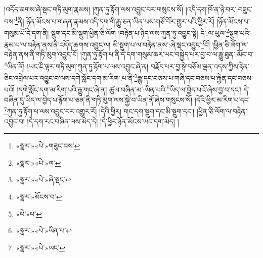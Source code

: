 །འདོད་ཆགས་ཞེ་སྡང་གཏི་མུག་རྣམས། །ཀུན་ཏུ་རྟོག་ལས་འབྱུང་བར་གསུངས་སོ། །འདི་དག་ཁོ་ན་ཉེ་བར་:བཟུང་བས་\footnote{«སྣར་»«པེ་»གཟུང་བས་}ནི། ཉོན་མོངས་པ་གཞན་རྣམས་འདི་དག་གི་རྒྱུ་ཅན་ཡིན་པས་གཙོ་བོར་གྱུར་པའི་ཕྱིར་རོ། །ཉོན་མོངས་པ་གསུམ་པོ་དེ་དག་ནི། སྡུག་དང་མི་སྡུག་ཕྱིན་ཅི་ལོག །བརྟེན་པ་ཉིད་ལས་ཀུན་ཏུ་འབྱུང་སྟེ། དེ་:ལ་ཡུལ་\footnote{«སྣར་»«པེ་»ལ་}སྡུག་པའི་རྣམ་པ་ལ་བརྟེན་ནས་ནི་འདོད་ཆགས་འབྱུང་ལ། མི་སྡུག་པ་ལ་བརྟེན་ནས་:ཞེ་སྡང་འབྱུང་\footnote{«སྣར་»«པེ་»ཞེ་སྡང་}ངོ། །ཕྱིན་ཅི་ལོག་ལ་བརྟེན་ནས་ནི་གཏི་མུག་འབྱུང་ངོ། །ཀུན་ཏུ་རྟོག་པ་ནི་དེ་དག་གསུམ་ཆར་ཡང་བསྐྱེད་པར་བྱ་བ་ལ་རྒྱུ་ཐུན་:མོང་བ་\footnote{«སྣར་»མོངས་བ་}ཡིན་ནོ། །ཡང་ཇི་ལྟར་གཏི་མུག་ཀུན་ཏུ་རྟོག་པ་ལས་འབྱུང་ཞེ་ན། བརྗོད་པར་བྱ་སྟེ་བཅོམ་ལྡན་འདས་ཀྱིས་རྟེན་ཅིང་འབྲེལ་པར་འབྱུང་བ་ལས་དགེ་སློང་དག་མ་རིག་:པ་ནི་\footnote{«པེ་»པ་}རྒྱུ་དང་བཅས་པ་གཞི་དང་བཅས་པ་རྐྱེན་དང་བཅས་པའོ། །དགེ་སློང་དག་མ་རིག་པའི་རྒྱུ་གང་ཞེ་ན། ཚུལ་བཞིན་མ་:ཡིན་པའི་\footnote{«སྣར་»«པེ་»ཡིན་པ་}ཡིད་ལ་བྱེད་པའོ་ཞེས་བྱ་བ་དང་། དེ་བཞིན་དུ་ཡིད་ལ་བྱེད་པ་རྙོག་པ་ཅན་ནི་གཏི་མུག་ལས་སྐྱེ་བ་ཡིན་ནོ་ཞེས་གསུངས་སོ། །དེའི་ཕྱིར་མ་རིག་པ་དང་\footnote{«སྣར་»«པེ་»ཡང་}ཀུན་ཏུ་རྟོག་པ་ལས་འབྱུང་བར་འགྱུར་རོ། །དེའི་ཕྱིར། གང་དག་སྡུག་དང་མི་སྡུག་དང་། །ཕྱིན་ཅི་ལོག་ལ་བརྟེན་འབྱུང་བ། །དེ་དག་རང་བཞིན་ལས་མེད་དེ། །དེ་ཕྱིར་ཉོན་མོངས་ཡང་དག་མེད། །
